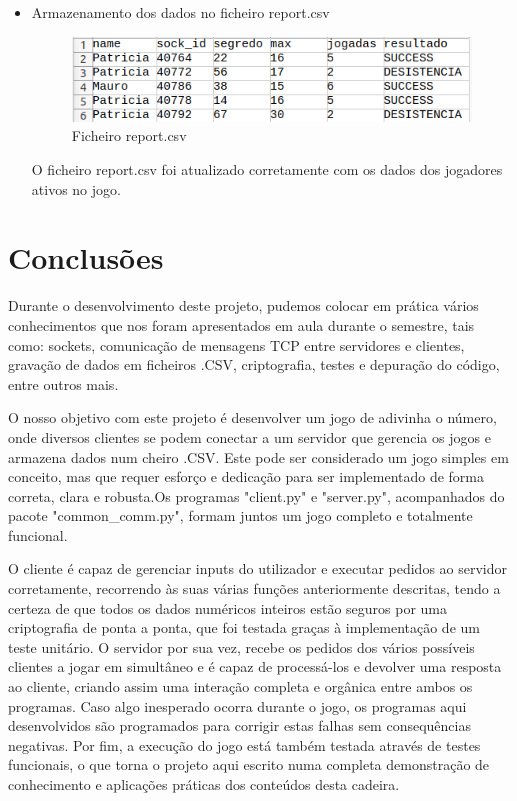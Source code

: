 \documentclass{report}
\begin{document}
\begin{itemize}
\item Armazenamento dos dados no ficheiro report.csv 
\begin{figure}[H]
        \centering
        \includegraphics[scale=0.70]{ficheiro}      
        \caption{Ficheiro report.csv}
\end{figure}
O ficheiro report.csv foi atualizado corretamente com os dados dos jogadores ativos no jogo.

\end{itemize}


\chapter{Conclusões}
\label{chap.conclusao}

Durante o desenvolvimento deste projeto, pudemos colocar em prática vários conhecimentos que nos foram apresentados em aula durante o semestre, tais como: sockets, comunicação de mensagens TCP entre servidores e clientes, gravação de dados em ficheiros .CSV, criptografia, testes e depuração do código, entre outros mais.

O nosso objetivo com este projeto é desenvolver um jogo de adivinha o número, onde diversos clientes se podem conectar a um servidor que gerencia os jogos e armazena dados num cheiro .CSV. Este pode ser considerado um jogo simples em conceito, mas que requer esforço e dedicação para ser implementado de forma correta, clara e robusta.Os programas "client.py" e "server.py", acompanhados do pacote "common\_comm.py", formam juntos um jogo completo e totalmente funcional.

O cliente é capaz de gerenciar inputs do utilizador e executar pedidos ao servidor corretamente, recorrendo às suas várias funções anteriormente descritas, tendo a certeza de que todos os dados numéricos inteiros estão seguros por uma criptografia de ponta a ponta, que foi testada graças à implementação de um teste
unitário. O servidor por sua vez, recebe os pedidos dos vários possíveis clientes a jogar em simultâneo e é capaz de processá-los e devolver uma resposta ao cliente, criando assim uma interação completa e orgânica entre ambos os programas. Caso algo inesperado ocorra durante o jogo, os programas aqui desenvolvidos são programados para corrigir estas falhas sem consequências negativas. Por fim, a execução do jogo está também testada através de testes
funcionais, o que torna o projeto aqui escrito numa completa demonstração de conhecimento e aplicações práticas dos conteúdos desta cadeira.
\end{document}
